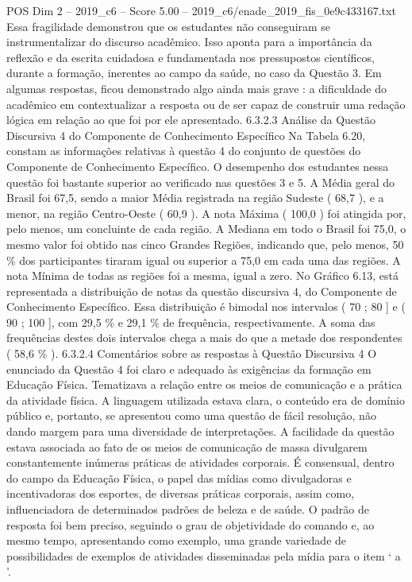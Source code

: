 \begin{textsample}{POS Dim 2 – 2019\_c6 – Score 5.00 – 2019\_c6/enade\_2019\_fis\_0e9c433167.txt}
Essa fragilidade demonstrou que os estudantes não conseguiram se instrumentalizar do discurso acadêmico.
Isso aponta para a importância da reflexão e da escrita cuidadosa e fundamentada nos pressupostos científicos, durante a formação, inerentes ao campo da saúde, no caso da Questão 3.
Em algumas respostas, ficou demonstrado algo ainda mais grave : a dificuldade do acadêmico em contextualizar a resposta ou de ser capaz de construir uma redação lógica em relação ao que foi por ele apresentado. 6.3.2.3 Análise da Questão Discursiva 4 do Componente de Conhecimento Específico Na Tabela 6.20, constam as informações relativas à questão 4 do conjunto de questões do Componente de Conhecimento Específico.
O desempenho dos estudantes nessa questão foi bastante superior ao verificado nas questões 3 e 5.
A Média geral do Brasil foi 67,5, sendo a maior Média registrada na região Sudeste ( 68,7 ), e a menor, na região Centro-Oeste ( 60,9 ).
A nota Máxima ( 100,0 ) foi atingida por, pelo menos, um concluinte de cada região.
A Mediana em todo o Brasil foi 75,0, o mesmo valor foi obtido nas cinco Grandes Regiões, indicando que, pelo menos, 50 \% dos participantes tiraram igual ou superior a 75,0 em cada uma das regiões.
A nota Mínima de todas as regiões foi a mesma, igual a zero.
No Gráfico 6.13, está representada a distribuição de notas da questão discursiva 4, do Componente de Conhecimento Específico.
Essa distribuição é bimodal nos intervalos ( 70 ; 80 ] e ( 90 ; 100 ], com 29,5 \% e 29,1 \% de frequência, respectivamente.
A soma das frequências destes dois intervalos chega a mais do que a metade dos respondentes ( 58,6 \% ). 6.3.2.4 Comentários sobre as respostas à Questão Discursiva 4 O enunciado da Questão 4 foi claro e adequado às exigências da formação em Educação Física.
Tematizava a relação entre os meios de comunicação e a prática da atividade física.
A linguagem utilizada estava clara, o conteúdo era de domínio público e, portanto, se apresentou como uma questão de fácil resolução, não dando margem para uma diversidade de interpretações.
A facilidade da questão estava associada ao fato de os meios de comunicação de massa divulgarem constantemente inúmeras práticas de atividades corporais.
É consensual, dentro do campo da Educação Física, o papel das mídias como divulgadoras e incentivadoras dos esportes, de diversas práticas corporais, assim como, influenciadora de determinados padrões de beleza e de saúde.
O padrão de resposta foi bem preciso, seguindo o grau de objetividade do comando e, ao mesmo tempo, apresentando como exemplo, uma grande variedade de possibilidades de exemplos de atividades disseminadas pela mídia para o item ‘ a ’.

\end{textsample}
